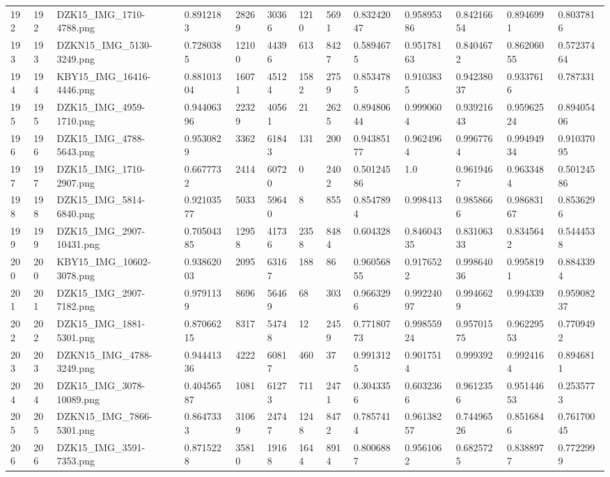\documentclass[11pt, a4paper, twoside]{report}
\begin{document}
\begin{longtable}[c]{@{}lllllllllllll@{}}
192 & 192 & DZK15\_IMG\_1710-4788.png & 0.8912183 & 28269 & 30366 & 1210 & 5691 & 0.83242047 & 0.95895386 & 0.84216654 & 0.8946991 & 0.8037816 \\
193 & 193 & DZKN15\_IMG\_5130-3249.png & 0.7280385 & 12100 & 44396 & 613 & 8427 & 0.5894675 & 0.95178163 & 0.8404672 & 0.86206055 & 0.57237464 \\
194 & 194 & KBY15\_IMG\_16416-4446.png & 0.88101304 & 16071 & 45124 & 1582 & 2759 & 0.8534785 & 0.9103835 & 0.94238037 & 0.9337616 & 0.787331 \\
195 & 195 & DZK15\_IMG\_4959-1710.png & 0.94406396 & 22329 & 40561 & 21 & 2625 & 0.89480644 & 0.9990604 & 0.93921643 & 0.95962524 & 0.89405406 \\
196 & 196 & DZK15\_IMG\_4788-5643.png & 0.9530829 & 3362 & 61843 & 131 & 200 & 0.94385177 & 0.9624964 & 0.9967764 & 0.99494934 & 0.91037095 \\
197 & 197 & DZK15\_IMG\_1710-2907.png & 0.6677732 & 2414 & 60720 & 0 & 2402 & 0.50124586 & 1.0 & 0.9619467 & 0.9633484 & 0.50124586 \\
198 & 198 & DZK15\_IMG\_5814-6840.png & 0.92103577 & 5033 & 59640 & 8 & 855 & 0.8547894 & 0.998413 & 0.9858666 & 0.98683167 & 0.8536296 \\
199 & 199 & DZK15\_IMG\_2907-10431.png & 0.70504385 & 12958 & 41736 & 2358 & 8484 & 0.604328 & 0.84604335 & 0.83106333 & 0.8345642 & 0.5444538 \\
200 & 200 & KBY15\_IMG\_10602-3078.png & 0.93862003 & 2095 & 63167 & 188 & 86 & 0.96056855 & 0.9176522 & 0.99864036 & 0.9958191 & 0.8843394 \\
201 & 201 & DZK15\_IMG\_2907-7182.png & 0.9791139 & 8696 & 56469 & 68 & 303 & 0.9663296 & 0.99224097 & 0.9946629 & 0.994339 & 0.95908237 \\
202 & 202 & DZK15\_IMG\_1881-5301.png & 0.87066215 & 8317 & 54748 & 12 & 2459 & 0.77180773 & 0.99855924 & 0.95701575 & 0.96229553 & 0.7709492 \\
203 & 203 & DZKN15\_IMG\_4788-3249.png & 0.94441336 & 4222 & 60817 & 460 & 37 & 0.9913125 & 0.9017514 & 0.999392 & 0.9924164 & 0.8946811 \\
204 & 204 & DZK15\_IMG\_3078-10089.png & 0.40456587 & 1081 & 61273 & 711 & 2471 & 0.3043356 & 0.6032366 & 0.9612356 & 0.95144653 & 0.2535773 \\
205 & 205 & DZKN15\_IMG\_7866-5301.png & 0.8647333 & 31069 & 24747 & 1248 & 8472 & 0.7857414 & 0.96138257 & 0.74496526 & 0.8516846 & 0.76170045 \\
206 & 206 & DZK15\_IMG\_3591-7353.png & 0.8715228 & 35810 & 19168 & 1644 & 8914 & 0.8006887 & 0.9561062 & 0.6825725 & 0.8388977 & 0.7722999 \\

\end{longtable}
\end{document}
